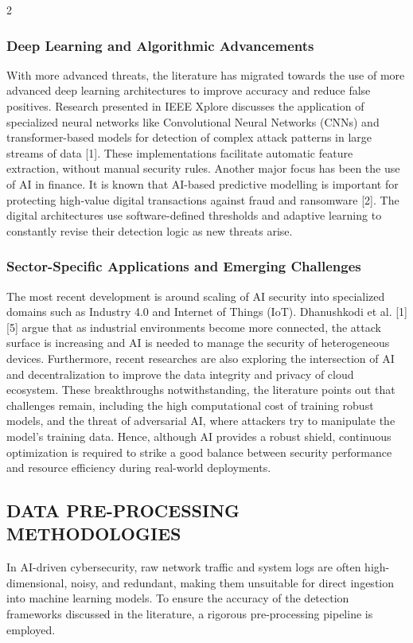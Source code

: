 \begin{multicols}{2}
  \subsubsection*{Deep Learning and Algorithmic Advancements}
  With more advanced threats, the literature has migrated towards the use of more advanced deep learning architectures to improve accuracy and reduce false positives. Research presented in IEEE Xplore discusses the application of specialized neural networks like Convolutional Neural Networks (CNNs) and transformer-based models for detection of complex attack patterns in large streams of data [1]. These implementations facilitate automatic feature extraction, without manual security rules. Another major focus has been the use of AI in finance. It is known that AI-based predictive modelling is important for protecting high-value digital transactions against fraud and ransomware [2]. The digital architectures use software-defined thresholds and adaptive learning to constantly revise their detection logic as new threats arise.

  \subsubsection*{Sector-Specific Applications and Emerging Challenges}
  The most recent development is around scaling of AI security into specialized domains such as Industry 4.0 and Internet of Things (IoT). Dhanushkodi et al. [1][5] argue that as industrial environments become more connected, the attack surface is increasing and AI is needed to manage the security of heterogeneous devices. Furthermore, recent researches are also exploring the intersection of AI and decentralization to improve the data integrity and privacy of cloud ecosystem. These breakthroughs notwithstanding, the literature points out that challenges remain, including the high computational cost of training robust models, and the threat of adversarial AI, where attackers try to manipulate the model’s training data. Hence, although AI provides a robust shield, continuous optimization is required to strike a good balance between security performance and resource efficiency during real-world deployments.

  \subsection*{\centering\uppercase{DATA PRE-PROCESSING METHODOLOGIES}}
  In AI-driven cybersecurity, raw network traffic and system logs are often high-dimensional, noisy, and redundant, making them unsuitable for direct ingestion into machine learning models. To ensure the accuracy of the detection frameworks discussed in the literature, a rigorous pre-processing pipeline is employed.

\end{multicols}
